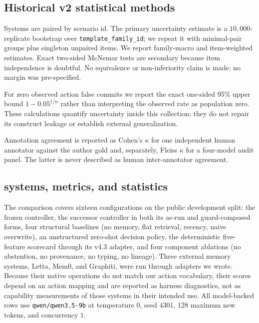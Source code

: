 \subsection{Historical v2 statistical methods}
\label{sec:stats}

Systems are paired by scenario id. The primary uncertainty estimate is a
$10{,}000$-replicate bootstrap over \texttt{template\_family\_id}; we repeat it
with minimal-pair groups plus singleton unpaired items. We report family-macro
and item-weighted estimates. Exact two-sided McNemar tests are secondary because
item independence is doubtful. No equivalence or non-inferiority claim is made:
no margin was pre-specified.

For zero observed action false commits we report the exact one-sided 95\% upper bound
$1-0.05^{1/n}$ rather than interpreting the observed rate as population zero.
These calculations quantify uncertainty inside this collection; they do not
repair its construct leakage or establish external generalization.

Annotation agreement is reported as Cohen's $\kappa$ for one independent human
annotator against the author gold and, separately, Fleiss $\kappa$ for a
four-model audit panel. The latter is never described as human
inter-annotator agreement.

\subsection{\mgpc{} systems, metrics, and statistics}

The \mgpc{} comparison covers sixteen configurations on the public development
split: the frozen controller, the successor controller in both
its as-run and guard-composed forms, four structural baselines (no memory, flat
retrieval, recency, naive overwrite), an unstructured zero-shot decision policy,
the deterministic five-feature scorecard through its v4.3 adapter, and four
component ablations (no abstention, no provenance, no typing, no lineage).
Three external memory systems, Letta, Mem0, and Graphiti, were run through adapters
we wrote. Because their native operations do not match our action vocabulary,
their scores depend on an action mapping and are reported as harness
diagnostics, not as capability measurements of those systems in their intended
use. All model-backed rows use \texttt{qwen/qwen3.5-9b} at temperature $0$,
seed $4301$, $128$ maximum new tokens, and concurrency $1$.

